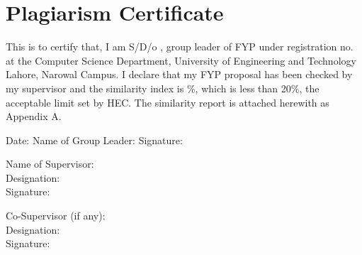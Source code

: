 \documentclass[11pt,a4paper]{article}
\begin{document}
\section*{Plagiarism Certificate}

\noindent This is to certify that, I am \underline{\hspace{3cm}} S/D/o \underline{\hspace{3cm}}, group leader of FYP under registration no. \underline{\hspace{2.5cm}} at the Computer Science Department, University of Engineering and Technology Lahore, Narowal Campus. I declare that my FYP proposal has been checked by my supervisor and the similarity index is \underline{\hspace{1.5cm}}\%, which is less than 20\%, the acceptable limit set by HEC. The similarity report is attached herewith as Appendix A.

\vspace{1cm}
\noindent Date: \underline{\hspace{3cm}} \hfill Name of Group Leader: \underline{\hspace{3cm}} \hfill Signature: \underline{\hspace{2cm}}

\vspace{1.5cm}
\noindent
\begin{minipage}{0.48\textwidth}
Name of Supervisor: \underline{\hspace{3cm}}\\[0.3cm]
Designation: \underline{\hspace{3cm}}\\[0.3cm]
Signature: \underline{\hspace{3cm}}
\end{minipage}
\hfill
\begin{minipage}{0.48\textwidth}
Co-Supervisor (if any): \underline{\hspace{3cm}}\\[0.3cm]
Designation: \underline{\hspace{3cm}}\\[0.3cm]
Signature: \underline{\hspace{3cm}}
\end{minipage}

\clearpage

\tableofcontents
\clearpage
\end{document}
